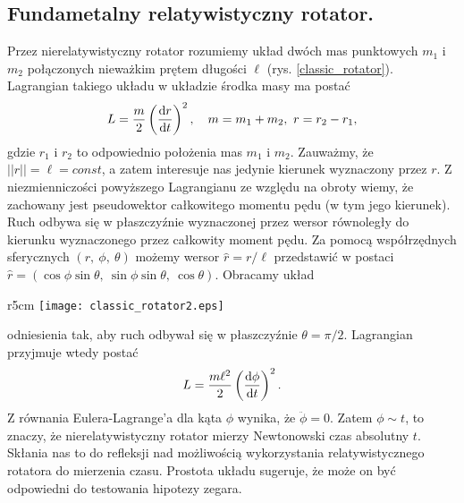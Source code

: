 \subsection{Fundametalny relatywistyczny rotator.}
Przez nierelatywistyczny rotator rozumiemy układ dwóch mas punktowych
$m_1$ i $m_2$ połączonych nieważkim
prętem długości $\ell$ (rys. \ref{classic_rotator}). Lagrangian 
takiego układu w układzie środka masy ma postać~\cite{landau1978krotki}
\begin{align*}
L = \frac{m }{2} \left(\frac{\text{d} r}{\text{d} t}\right)^2, 
\quad m=m_1+m_2,\ r=r_2-r_1,
\end{align*}
gdzie $r_1$ i $r_2$ to odpowiednio położenia mas $m_1$ i $m_2$.
Zauważmy, że $||r|| =\ell = const$, a zatem interesuje nas jedynie kierunek 
wyznaczony przez $r$.
Z niezmienniczości powyższego Lagrangianu ze względu na obroty wiemy, że
 zachowany jest pseudowektor całkowitego
momentu pędu (w tym jego kierunek). Ruch
odbywa się w płaszczyźnie wyznaczonej przez 
wersor równoległy do kierunku wyznaczonego 
przez całkowity moment pędu.
 Za pomocą  współrzędnych sferycznych $(r,\ \phi,\ \theta)$ 
możemy wersor $ \hat{r} = r / \ell$  przedstawić w postaci
 $\hat{r} = ( \cos \phi \sin\theta, \ \sin\phi\sin\theta,\ \cos\theta )$.
Obracamy układ 
\begin{wrapfigure}[8]{r}{5cm}
\centering
\texttt{[image: classic\_rotator2.eps]}
\caption{Klasyczny rotator.
}
\label{classic_rotator}
\end{wrapfigure}
odniesienia tak, aby ruch odbywał się w
 płaszczyźnie $\theta = \pi/2$. 
Lagrangian 
przyjmuje wtedy postać
\begin{align*}
L = \frac{m\ell^2 }{2} \left(\frac{\text{d} \phi}{\text{d} t}\right)^2.
\end{align*}
Z równania Eulera-Lagrange'a dla kąta $\phi$ wynika, że 
$\ddot{\phi} = 0.$
Zatem $\phi \sim t$, to znaczy, że
nierelatywistyczny rotator mierzy Newtonowski czas
absolutny $t$. Skłania nas to do refleksji nad możliwością 
wykorzystania relatywistycznego rotatora 
do mierzenia czasu. Prostota układu sugeruje, że 
może on być odpowiedni do testowania hipotezy zegara.

